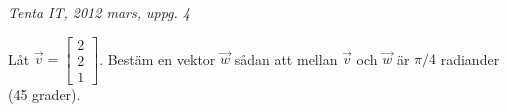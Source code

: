 {\it Tenta IT, 2012 mars, uppg. 4}

Låt $\vec{v}=\begin{bmatrix}2\\2\\1\end{bmatrix}$. Bestäm en vektor $\vec{w}$ sådan att mellan $\vec{v}$ och $\vec{w}$ är $\pi/4$ radiander (45 grader).